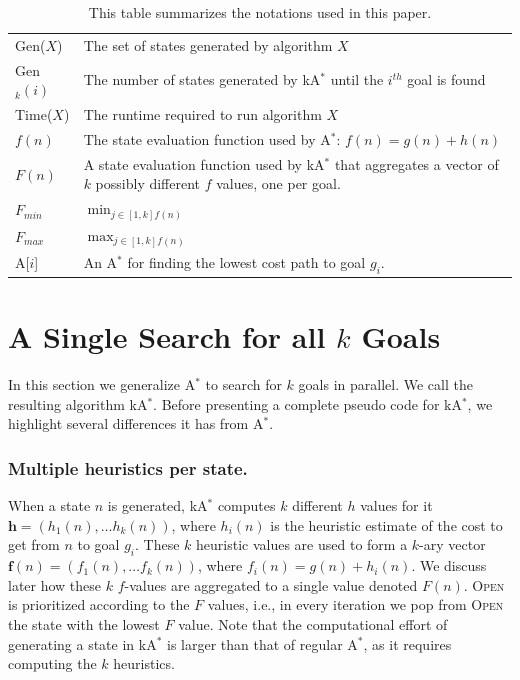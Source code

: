 \documentclass{aicom2e}
\newcommand{\astar}{A$^*$}
\newcommand{\kastar}{kA$^*$}
\newcommand{\astari}[1]{A[$#1$]}
\newcommand{\open}{\textsc{Open}}
\begin{document}
\begin{table}
	\begin{tabular}{|l|l|}
		\hline
		Gen($X$)	& The set of states generated by algorithm $X$ \\
		Gen$_k(i)$ 	& The number of states generated by \kastar{} until the $i^{th}$ goal is found\\
		Time($X$)	& The runtime required to run algorithm $X$ \\
		$f(n)$		& The state evaluation function used by \astar{}: $f(n)=g(n)+h(n)$ \\
		$F(n)$		& A state evaluation function used by \kastar{} that aggregates a vector of $k$ possibly different $f$ values, one per goal. \\
		$F_{min}$   & $\min_{j\in[1,k] f(n)}$\\
		$F_{max}$   & $\max_{j\in[1,k] f(n)}$\\
		\astari{i}  & An \astar{} for finding the lowest cost path to goal $g_i$. \\
		
		\hline
	\end{tabular}
\label{tab:notations}
\caption{This table summarizes the notations used in this paper.}
\end{table}


\section{A Single Search for all  $k$ Goals}
\label{sec:one-k-goal-search}
In this section we generalize \astar{} to search for $k$ goals in parallel. 
We call the resulting algorithm \kastar{}. 
Before presenting a complete pseudo code for \kastar{}, we highlight several differences it has from \astar{}. 

\subsubsection*{Multiple heuristics per state.} When a state $n$ is generated, \kastar{} computes 
$k$ different $h$ values for it $\textbf{h}=(h_1(n),\ldots h_k(n))$, where $h_i(n)$ is the heuristic estimate of the cost to get from $n$ to goal $g_i$. These $k$ heuristic values are used to form a $k$-ary vector $\textbf{f}(n)=(f_1(n),\ldots f_k(n))$, where $f_i(n)=g(n)+h_i(n)$. We discuss later how these $k$ $f$-values are aggregated to a single value denoted $F(n)$. \open{} is prioritized according to the $F$ values, i.e., in every iteration we pop from \open{} the state with the lowest $F$ value. Note that the computational effort of generating a state in \kastar{} is larger than that of regular \astar{}, as it requires computing the $k$ heuristics. %
\end{document}
